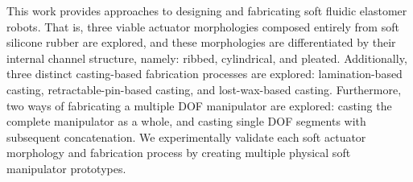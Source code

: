 This work provides approaches to designing and fabricating soft fluidic elastomer robots.
%
%
That is, three viable actuator morphologies composed entirely from soft silicone rubber are explored, and these morphologies are differentiated by their internal channel structure, namely: ribbed, cylindrical, and pleated.
%
Additionally, three distinct casting-based fabrication processes are explored: lamination-based casting, retractable-pin-based casting, and lost-wax-based casting.
%
Furthermore, two ways of fabricating a multiple DOF manipulator are explored: casting the complete manipulator as a whole, and casting single DOF segments with subsequent concatenation.
%
We experimentally validate each soft actuator morphology and fabrication process by creating multiple physical soft manipulator prototypes.

